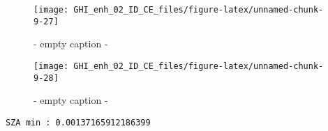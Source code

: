 \documentclass[
  10pt,
  a4paper,oneside]{article}
\begin{document}
\begin{figure}[H]

{\centering \texttt{[image: GHI\_enh\_02\_ID\_CE\_files/figure-latex/unnamed-chunk-9-27]} 

}

\caption{ - empty caption - }\label{fig:unnamed-chunk-9-27}
\end{figure}
\begin{figure}[H]

{\centering \texttt{[image: GHI\_enh\_02\_ID\_CE\_files/figure-latex/unnamed-chunk-9-28]} 

}

\caption{ - empty caption - }\label{fig:unnamed-chunk-9-28}
\end{figure}

\begin{verbatim}
SZA min : 0.00137165912186399 
\end{verbatim}
\end{document}
